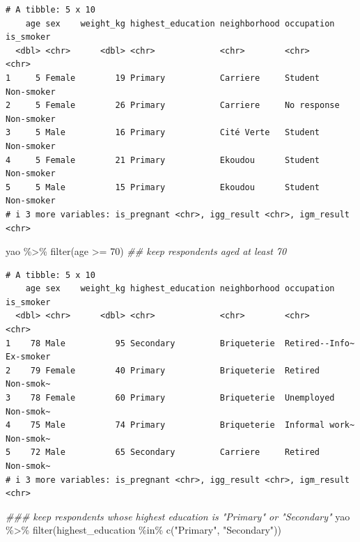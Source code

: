 \documentclass[
  letterpaper,
  DIV=11,
  numbers=noendperiod]{scrreprt}
\newenvironment{Shaded}{\begin{snugshade}}{\end{snugshade}}
\newcommand{\DecValTok}[1]{\textcolor[rgb]{0.68,0.00,0.00}{#1}}
\newcommand{\DocumentationTok}[1]{\textcolor[rgb]{0.37,0.37,0.37}{\textit{#1}}}
\newcommand{\FunctionTok}[1]{\textcolor[rgb]{0.28,0.35,0.67}{#1}}
\newcommand{\NormalTok}[1]{\textcolor[rgb]{0.00,0.23,0.31}{#1}}
\newcommand{\SpecialCharTok}[1]{\textcolor[rgb]{0.37,0.37,0.37}{#1}}
\newcommand{\StringTok}[1]{\textcolor[rgb]{0.13,0.47,0.30}{#1}}
\begin{document}
\begin{verbatim}
# A tibble: 5 x 10
    age sex    weight_kg highest_education neighborhood occupation  is_smoker 
  <dbl> <chr>      <dbl> <chr>             <chr>        <chr>       <chr>     
1     5 Female        19 Primary           Carriere     Student     Non-smoker
2     5 Female        26 Primary           Carriere     No response Non-smoker
3     5 Male          16 Primary           Cité Verte   Student     Non-smoker
4     5 Female        21 Primary           Ekoudou      Student     Non-smoker
5     5 Male          15 Primary           Ekoudou      Student     Non-smoker
# i 3 more variables: is_pregnant <chr>, igg_result <chr>, igm_result <chr>
\end{verbatim}

\begin{Shaded}
\begin{Highlighting}[]
\NormalTok{yao }\SpecialCharTok{\%\textgreater{}\%} \FunctionTok{filter}\NormalTok{(age }\SpecialCharTok{\textgreater{}=} \DecValTok{70}\NormalTok{) }\DocumentationTok{\#\# keep respondents aged at least 70}
\end{Highlighting}
\end{Shaded}

\begin{verbatim}
# A tibble: 5 x 10
    age sex    weight_kg highest_education neighborhood occupation     is_smoker
  <dbl> <chr>      <dbl> <chr>             <chr>        <chr>          <chr>    
1    78 Male          95 Secondary         Briqueterie  Retired--Info~ Ex-smoker
2    79 Female        40 Primary           Briqueterie  Retired        Non-smok~
3    78 Female        60 Primary           Briqueterie  Unemployed     Non-smok~
4    75 Male          74 Primary           Briqueterie  Informal work~ Non-smok~
5    72 Male          65 Secondary         Carriere     Retired        Non-smok~
# i 3 more variables: is_pregnant <chr>, igg_result <chr>, igm_result <chr>
\end{verbatim}

\begin{Shaded}
\begin{Highlighting}[]
\DocumentationTok{\#\#\# keep respondents whose highest education is "Primary" or "Secondary"}
\NormalTok{yao }\SpecialCharTok{\%\textgreater{}\%} \FunctionTok{filter}\NormalTok{(highest\_education }\SpecialCharTok{\%in\%} \FunctionTok{c}\NormalTok{(}\StringTok{"Primary"}\NormalTok{, }\StringTok{"Secondary"}\NormalTok{))}
\end{Highlighting}
\end{Shaded}
\end{document}
